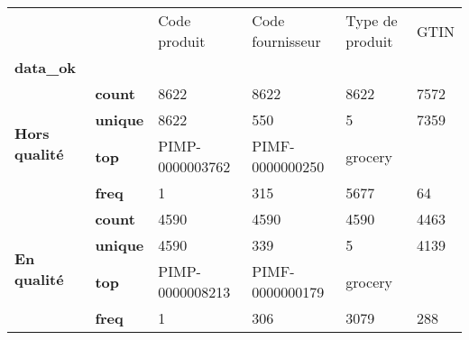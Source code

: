 \begin{tabularx}{\linewidth}{lXXXXX}
\toprule
           &      &     Code produit & Code fournisseur & Type de produit &  GTIN \\
\textbf{data\_ok} & {} &                  &                  &                 &       \\
\midrule
\multirow{4}{*}{\textbf{Hors qualité}} & \textbf{count} &             8622 &             8622 &            8622 &  7572 \\
           & \textbf{unique} &             8622 &              550 &               5 &  7359 \\
           & \textbf{top} &  PIMP-0000003762 &  PIMF-0000000250 &         grocery &       \\
           & \textbf{freq} &                1 &              315 &            5677 &    64 \\
\cline{1-6}
\multirow{4}{*}{\textbf{En qualité}} & \textbf{count} &             4590 &             4590 &            4590 &  4463 \\
           & \textbf{unique} &             4590 &              339 &               5 &  4139 \\
           & \textbf{top} &  PIMP-0000008213 &  PIMF-0000000179 &         grocery &       \\
           & \textbf{freq} &                1 &              306 &            3079 &   288 \\
\bottomrule
\end{tabularx}
